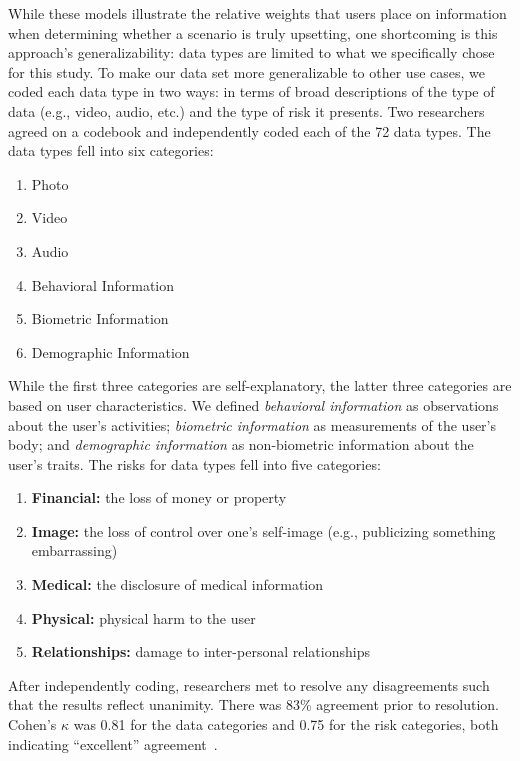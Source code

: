 \documentclass[conference]{IEEEtran}
\begin{document}
While these models illustrate the relative weights that users place on information when determining whether a scenario is truly upsetting, one shortcoming is this approach's generalizability: data types are limited to what we specifically chose for this study. To make our data set more generalizable to other use cases, we coded each data type in two ways: in terms of broad descriptions of the type of data (e.g., video, audio, etc.) and the type of risk it presents. Two researchers agreed on a codebook and independently coded each of the 72 data types. The data types fell into six categories:

\begin{enumerate}[topsep=0pt,itemsep=-1ex,partopsep=1ex,parsep=1ex]
\item Photo
\item Video
\item Audio
\item Behavioral Information
\item Biometric Information
\item Demographic Information
\end{enumerate}

While the first three categories are self-explanatory, the latter three categories are based on user characteristics. We defined {\it behavioral information} as observations about the user's activities; {\it biometric information} as measurements of the user's body; and {\it demographic information} as non-biometric information about the user's traits. The risks for data types fell into five categories:

\begin{enumerate}[topsep=0pt,itemsep=-1ex,partopsep=1ex,parsep=1ex]
\item {\bf Financial:} the loss of money or property
\item {\bf Image:} the loss of control over one's self-image (e.g., publicizing something embarrassing)
\item {\bf Medical:} the disclosure of medical information
\item {\bf Physical:} physical harm to the user
\item {\bf Relationships:} damage to inter-personal relationships
\end{enumerate}

After independently coding,  researchers met to resolve any disagreements such that the results reflect unanimity. There was  83\% agreement prior to resolution. Cohen's $\kappa$ was 0.81 for the data categories and 0.75 for the  risk categories, both indicating ``excellent'' agreement~\cite{Fleiss2003}. 
\end{document}
